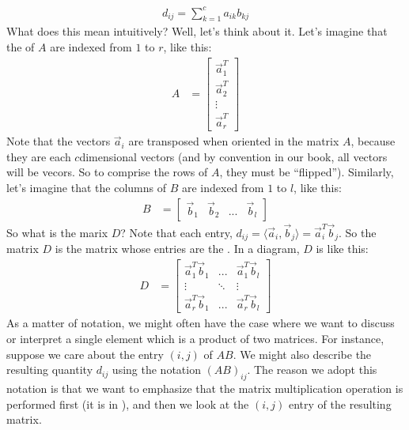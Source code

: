 \documentclass[letterpaper,10pt,english]{jupyterBook}
\begin{document}
\begin{align*}
    d_{ij} = \sum_{k = 1}^c a_{ik}b_{kj}
\end{align*}
\sphinxAtStartPar
What does this mean intuitively? Well, let’s think about it. Let’s imagine that the  of \(A\) are indexed from \(1\) to \(r\), like this:
\begin{align*}
    A &= \begin{bmatrix}
        \vec a_1^T \\
        \vec a_2^T \\
        \vdots \\
        \vec a_r^T
    \end{bmatrix}
\end{align*}
\sphinxAtStartPar
Note that the vectors \(\vec a_i\) are transposed when oriented in the matrix \(A\), because they are each \(c\)\sphinxhyphen{}dimensional vectors (and by convention in our book, all vectors will be  vecors. So to comprise the rows of \(A\), they must be “flipped”). Similarly, let’s imagine that the columns of \(B\) are indexed from \(1\) to \(l\), like this:
\begin{align*}
    B &= \begin{bmatrix}
        \vec b_1 & \vec b_2 & ... & \vec b_l
    \end{bmatrix}
\end{align*}
\sphinxAtStartPar
So what is the marix \(D\)? Note that each entry, \(d_{ij} = \langle \vec a_i, \vec b_j\rangle = \vec a_i^T \vec b_j\). So the matrix \(D\) is the matrix whose entries are the . In a diagram, \(D\) is like this:
\begin{align*}
    D &= \begin{bmatrix}
        \vec a_1^T\vec b_1 & ... & \vec a_1^T \vec b_l \\
        \vdots & \ddots & \vdots \\
        \vec a_r^T \vec b_1 & ... & \vec a_r^T \vec b_l
    \end{bmatrix}
\end{align*}
\sphinxAtStartPar
As a matter of notation, we might often have the case where we want to discuss or interpret a single element which is a product of two matrices. For instance, suppose we care about the entry \((i, j)\) of \(AB\). We might also describe the resulting quantity \(d_{ij}\) using the notation \((AB)_{ij}\). The reason we adopt this notation is that we want to emphasize that the matrix multiplication operation is performed first (it is in ), and then we look at the \((i,j)\) entry of the resulting matrix.
\end{document}

